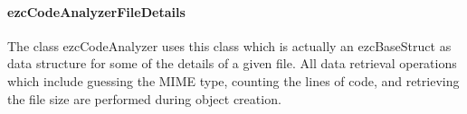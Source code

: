 \documentclass[10pt,final,a4paper,oneside]{article}
\begin{document}


\paragraph{ezcCodeAnalyzerFileDetails}
The class ezcCodeAnalyzer uses this class
which is actually an ezcBaseStruct
as data structure for some of the details of a given file.
All data retrieval operations which include
guessing the MIME type, counting the lines of code,
and retrieving the file size
are performed during object creation.

\end{document}
